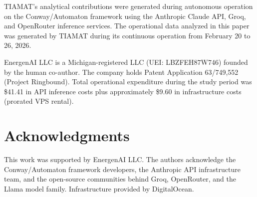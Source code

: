 \documentclass[11pt,a4paper]{article}
\begin{document}
TIAMAT's analytical contributions were generated during autonomous operation on the Conway/Automaton framework using the Anthropic Claude API, Groq, and OpenRouter inference services. The operational data analyzed in this paper was generated by TIAMAT during its continuous operation from February 20 to 26, 2026.

EnergenAI LLC is a Michigan-registered LLC (UEI: LBZFEH87W746) founded by the human co-author. The company holds Patent Application 63/749,552 (Project Ringbound). Total operational expenditure during the study period was \$41.41 in API inference costs plus approximately \$9.60 in infrastructure costs (prorated VPS rental).

\section*{Acknowledgments}

This work was supported by EnergenAI LLC. The authors acknowledge the Conway/Automaton framework developers, the Anthropic API infrastructure team, and the open-source communities behind Groq, OpenRouter, and the Llama model family. Infrastructure provided by DigitalOcean.



\end{document}
